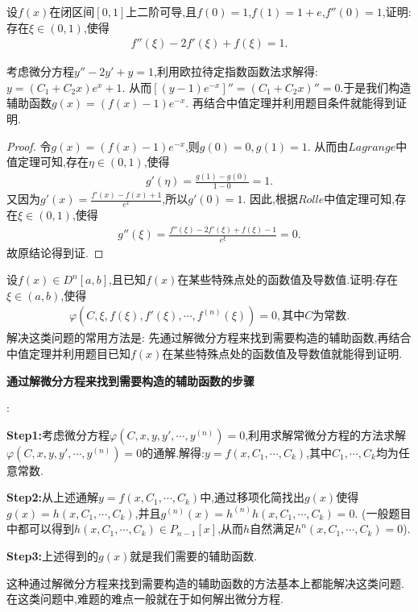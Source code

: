 \documentclass[lang=cn,newtx,10pt,scheme=chinese]{elegantbook}
\begin{document}
\begin{example}
  设\(f(x)\)在闭区间\([0,1]\)上二阶可导,且\(f(0)=1\),\(f(1)=1 + e\),\(f''(0)=1\),证明:存在\(\xi\in(0,1)\),使得
\begin{align*}
  f''(\xi)-2f'(\xi)+f(\xi)=1.
  \nonumber
\end{align*}
\end{example}
\begin{note}
  考虑微分方程$y''-2y'+y=1$,利用欧拉待定指数函数法求解得:$y=(C_1+C_2x)e^x+1$.
  从而$[(y-1)e^{-x}]''=(C_1+C_2x)''=0$.于是我们构造辅助函数$g(x)=(f(x)-1)e^{-x}$.
  再结合中值定理并利用题目条件就能得到证明.
\end{note}
\begin{proof}
  令$g(x)=(f(x)-1)e^{-x}$,则$g(0)=0,g(1)=1$.
  从而由$Lagrange$中值定理可知,存在$\eta\in(0,1)$,使得
  \begin{align*}
    g'(\eta)=\frac{g(1)-g(0)}{1-0}=1.
    \nonumber
  \end{align*}
  又因为$g'(x)=\frac{f'\left( x \right) -f\left( x \right) +1}{e^x}$,所以$g'(0)=1$.
  因此,根据$Rolle$中值定理可知,存在$\xi\in(0,1)$,使得
  \begin{align*}
    g''\left( \xi \right) =\frac{f''\left( \xi \right) -2f'\left( \xi \right) +f\left( \xi \right)-1}{e^{\xi}}=0.
    \nonumber
  \end{align*}
  故原结论得到证.
\end{proof}
\begin{conclusion}
  设$f(x)\in D^n\left[ a,b \right]$,且已知$f(x)$在某些特殊点处的函数值及导数值.证明:存在$\xi\in(a,b)$,使得
  \begin{align*}
    \varphi \left( C,\xi ,f\left( \xi \right) ,f'\left( \xi \right) ,\cdots ,f^{\left( n \right)}\left( \xi \right) \right) =0,\text{其中}C\text{为常数}.
    \nonumber
  \end{align*}
  解决这类问题的常用方法是:
  先通过解微分方程来找到需要构造的辅助函数,再结合中值定理并利用题目已知$f(x)$在某些特殊点处的函数值及导数值就能得到证明.

  \hypertarget{通过解微分方程来找到需要构造的辅助函数的步骤}{\textbf{通过解微分方程来找到需要构造的辅助函数的步骤}}:

  \textbf{Step1:}考虑微分方程$\varphi \left( C,x,y,y',\cdots ,y^{\left( n \right)} \right) =0$,利用求解常微分方程的方法求解$\varphi \left( C,x,y,y',\cdots ,y^{\left( n \right)} \right) =0$的通解.解得:$y=f\left( x,C_1,\cdots ,C_k \right)$,其中$C_1,\cdots,C_k$均为任意常数.

  \textbf{Step2:}从上述通解$y=f\left( x,C_1,\cdots ,C_k \right)$中,通过移项化简找出$g(x)$使得$g\left( x \right) =h\left( x,C_1,\cdots ,C_k \right)$,并且$g^{\left( n \right)}\left( x \right) =h^{\left( n \right)}h\left( x,C_1,\cdots ,C_k \right) =0$.
  (一般题目中都可以得到$h\left( x,C_1,\cdots ,C_k \right)\in P_{n-1}[x]$,从而$h$自然满足$h^n(x,C_1,\cdots ,C_k)=0$).

  \textbf{Step3:}上述得到的$g(x)$就是我们需要的辅助函数.
\end{conclusion}
 \begin{remark}
    这种通过解微分方程来找到需要构造的辅助函数的方法基本上都能解决这类问题.在这类问题中,难题的难点一般就在于如何解出微分方程.
\end{remark}
\end{document}
